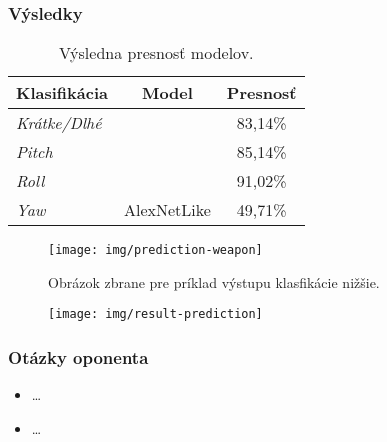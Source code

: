 \documentclass[10pt,xcolor=pdflatex]{beamer}
\begin{document}
\begin{frame}\frametitle{Výsledky}
    \begin{table}
        \begin{tabular}{ l | c | c }
            \textbf{Klasifikácia}   & \textbf{Model}                    & \textbf{Presnosť}   \\
            \hline \hline
            \textit{Krátke/Dlhé}    &                                   & {83,14\%}           \\
            \hline
            \textit{Pitch}          &                                   & {85,14\%}           \\
            \textit{Roll}           &                                   & {91,02\%}           \\
            \textit{Yaw}            & \multirow{-4}{*}{AlexNetLike}     & {49,71\%}
        \end{tabular}
        \caption{Výsledna presnosť modelov.}
    \end{table}

    \begin{figure}[H]
        \centering
        \texttt{[image: img/prediction-weapon]}
        \caption{Obrázok zbrane pre príklad výstupu klasfikácie nižšie.}
    \end{figure}

    \begin{figure}[H]
        \centering
        \texttt{[image: img/result-prediction]}
    \end{figure}

\end{frame}



\begin{frame}\frametitle{Otázky oponenta}
    \begin{itemize}
        \item \dots
        \item \dots
    \end{itemize}
\end{frame}
\end{document}
